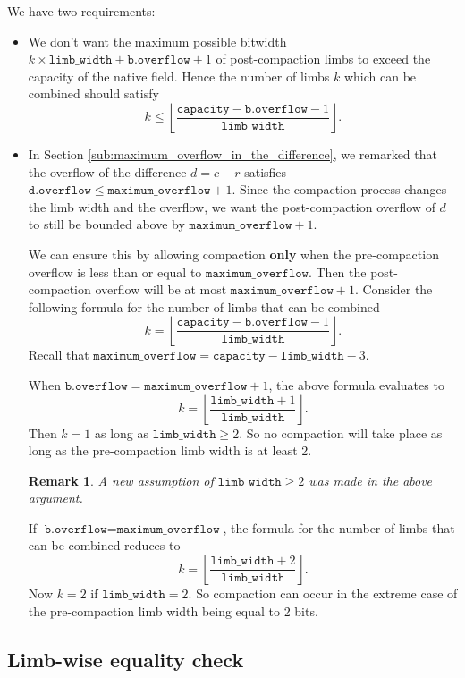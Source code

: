 \documentclass[a4paper, 12pt]{article}
\newtheorem*{remark}{Remark}
\begin{document}
We have two requirements:
\begin{itemize}
  \item We don't want the maximum possible bitwidth $k\times \texttt{limb\_width} + \texttt{b.overflow} + 1$ of post-compaction limbs to exceed the capacity of the native field. Hence the number of limbs $k$ which can be combined should satisfy
    $$
    k \le \left\lfloor \frac{\texttt{capacity}-\texttt{b.overflow}-1}{\texttt{limb\_width}}\right\rfloor.
    $$

  \item In Section \ref{sub:maximum_overflow_in_the_difference}, we remarked that the overflow of the difference $d = c-r$ satisfies $\texttt{d.overflow} \le \texttt{maximum\_overflow} + 1$. Since the compaction process changes the limb width and the overflow, we want the post-compaction overflow of $d$ to still be bounded above by $\texttt{maximum\_overflow} + 1$.

    We can ensure this by allowing compaction \textbf{only} when the pre-compaction overflow is less than or equal to $\texttt{maximum\_overflow}$. Then the post-compaction overflow will be at most $\texttt{maximum\_overflow} + 1$. Consider the following formula for the number of limbs that can be combined
    $$
    k = \left\lfloor \frac{\texttt{capacity}-\texttt{b.overflow}- 1}{\texttt{limb\_width}}\right\rfloor.
    $$
    Recall that $\texttt{maximum\_overflow}= \texttt{capacity} - \texttt{limb\_width} - 3$.

    When $\texttt{b.overflow} = \texttt{maximum\_overflow} + 1$, the above formula evaluates to
    $$
    k = \left\lfloor \frac{\texttt{limb\_width}+ 1}{\texttt{limb\_width}}\right\rfloor.
    $$
    Then $k = 1$ as long as $\texttt{limb\_width} \ge 2$. So no compaction will take place as long as the pre-compaction limb width is at least 2.
    \begin{remark}
    A new assumption of $\texttt{limb\_width} \ge 2$ was made in the above argument.
    \end{remark}

    If $\texttt{b.overflow} = \texttt{maximum\_overflow}$, the formula for the number of limbs that can be combined reduces to
    $$
    k = \left\lfloor \frac{\texttt{limb\_width}+ 2}{\texttt{limb\_width}}\right\rfloor.
    $$
    Now $k=2$ if $\texttt{limb\_width} = 2$. So compaction can occur in the extreme case of the pre-compaction limb width being equal to 2 bits.
\end{itemize}

\subsection{Limb-wise equality check}%
\label{sub:limb_wise_equality_check}
\end{document}

